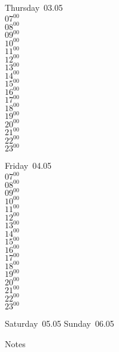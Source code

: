 \documentclass[11pt, a4paper]{book}\usepackage[]{graphicx}\usepackage[]{color}
\begin{document}
\begin{weekdaybox}
  Thursday~03.05\\
  { 
  \vfill
  $07^{00}$\\
$08^{00}$\\
$09^{00}$\\
$10^{00}$\\
$11^{00}$\\
$12^{00}$\\
$13^{00}$\\
$14^{00}$\\
$15^{00}$\\
$16^{00}$\\
$17^{00}$\\
$18^{00}$\\
$19^{00}$\\
$20^{00}$\\
$21^{00}$\\
$22^{00}$\\
$23^{00}$\\
  }
\end{weekdaybox} 
\begin{weekdaybox}
  Friday~04.05\\
  { 
  \vfill
  $07^{00}$\\
$08^{00}$\\
$09^{00}$\\
$10^{00}$\\
$11^{00}$\\
$12^{00}$\\
$13^{00}$\\
$14^{00}$\\
$15^{00}$\\
$16^{00}$\\
$17^{00}$\\
$18^{00}$\\
$19^{00}$\\
$20^{00}$\\
$21^{00}$\\
$22^{00}$\\
$23^{00}$\\
  }
\end{weekdaybox}
\begin{weekendbox}
  Saturday~05.05
  \tcblower
  Sunday~06.05
\end{weekendbox} %
\begin{notebox}
  Notes
\end{notebox}
\clearpage
\end{document}
